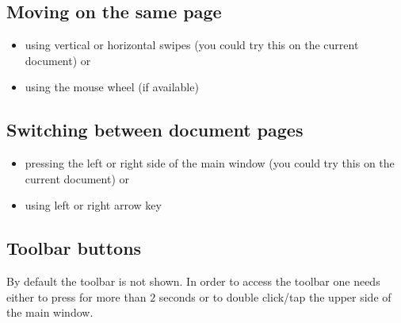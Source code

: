 \documentclass[journal,12pt]{IEEEtran}
\begin{document}
\subsection{Moving on the same page}
\begin{itemize}
 \item using vertical or horizontal swipes (you could try this on the current document) or
 \item using the mouse wheel (if available)
\end{itemize}

\subsection{Switching between document pages}
\begin{itemize}
 \item pressing the left or right side of the main window (you could try this on the current document) or
 \item using left or right arrow key
\end{itemize}

\subsection{Toolbar buttons}

By default the toolbar is not shown. In order to access the toolbar one needs either to press for more than $2$ seconds or to double click/tap the upper side of the main window.
\end{document}
